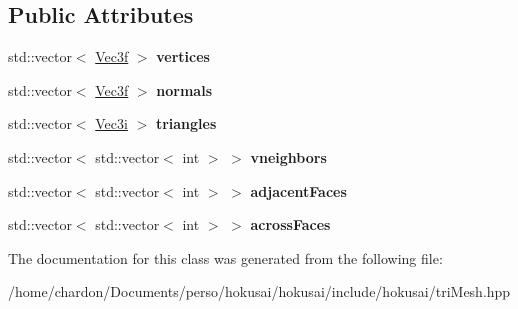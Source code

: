 \subsection*{Public Attributes}
\begin{DoxyCompactItemize}
\item 
\hypertarget{classhokusai_1_1TriMesh_a7cdbc7d9e4248431f08c369c00e56ae4}{std\+::vector$<$ \hyperlink{classhokusai_1_1Vec3}{Vec3f} $>$ {\bfseries vertices}}\label{classhokusai_1_1TriMesh_a7cdbc7d9e4248431f08c369c00e56ae4}

\item 
\hypertarget{classhokusai_1_1TriMesh_af6d1acef7aaba6edabd63e9a33420443}{std\+::vector$<$ \hyperlink{classhokusai_1_1Vec3}{Vec3f} $>$ {\bfseries normals}}\label{classhokusai_1_1TriMesh_af6d1acef7aaba6edabd63e9a33420443}

\item 
\hypertarget{classhokusai_1_1TriMesh_a4e46368161f576701d4d0d3797f8b0e1}{std\+::vector$<$ \hyperlink{classhokusai_1_1Vec3}{Vec3i} $>$ {\bfseries triangles}}\label{classhokusai_1_1TriMesh_a4e46368161f576701d4d0d3797f8b0e1}

\item 
\hypertarget{classhokusai_1_1TriMesh_a08a649a7d4e011d5f9f80f7f15328e17}{std\+::vector$<$ std\+::vector$<$ int $>$ $>$ {\bfseries vneighbors}}\label{classhokusai_1_1TriMesh_a08a649a7d4e011d5f9f80f7f15328e17}

\item 
\hypertarget{classhokusai_1_1TriMesh_ae953089e83d75a007c785ebf3b7c8a7a}{std\+::vector$<$ std\+::vector$<$ int $>$ $>$ {\bfseries adjacent\+Faces}}\label{classhokusai_1_1TriMesh_ae953089e83d75a007c785ebf3b7c8a7a}

\item 
\hypertarget{classhokusai_1_1TriMesh_ac599100574b4866af51def5f94f480ea}{std\+::vector$<$ std\+::vector$<$ int $>$ $>$ {\bfseries across\+Faces}}\label{classhokusai_1_1TriMesh_ac599100574b4866af51def5f94f480ea}

\end{DoxyCompactItemize}


The documentation for this class was generated from the following file\+:\begin{DoxyCompactItemize}
\item 
/home/chardon/\+Documents/perso/hokusai/hokusai/include/hokusai/tri\+Mesh.\+hpp\end{DoxyCompactItemize}
